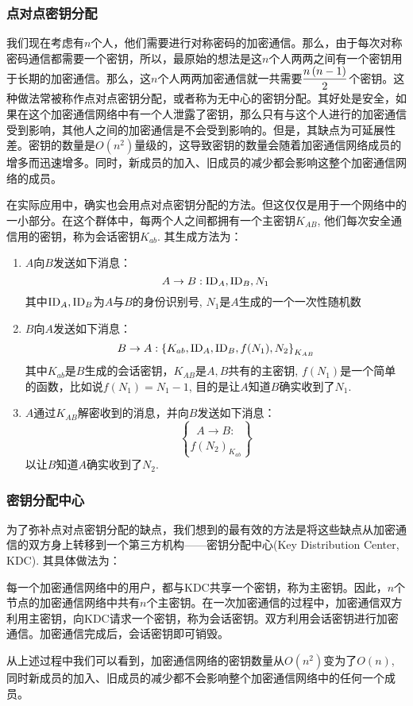 \subsubsection{点对点密钥分配}
我们现在考虑有$n$个人，他们需要进行对称密码的加密通信。那么，由于每次对称密码通信都需要一个密钥，所以，最原始的想法是这$n$个人两两之间有一个密钥用于长期的加密通信。那么，这$n$个人两两加密通信就一共需要$\displaystyle\frac{n\left( {n-1}\right)}{2}$个密钥。这种做法常被称作点对点密钥分配，或者称为无中心的密钥分配。其好处是安全，如果在这个加密通信网络中有一个人泄露了密钥，那么只有与这个人进行的加密通信受到影响，其他人之间的加密通信是不会受到影响的。但是，其缺点为可延展性差。密钥的数量是$O(n^2)$量级的，这导致密钥的数量会随着加密通信网络成员的增多而迅速增多。同时，新成员的加入、旧成员的减少都会影响这整个加密通信网络的成员。\par
在实际应用中，确实也会用点对点密钥分配的方法。但这仅仅是用于一个网络中的一小部分。在这个群体中，每两个人之间都拥有一个主密钥$K_{AB}$, 他们每次安全通信用的密钥，称为会话密钥$K_{ab}$. 其生成方法为：
\begin{enumerate}
	\item $A$向$B$发送如下消息：
	\[A\to B: \mathrm{ID}_A, \mathrm{ID}_B, N_1\]
	其中$\mathrm{ID}_A, \mathrm{ID}_B$为$A$与$B$的身份识别号, $N_1$是$A$生成的一个一次性随机数
	\item $B$向$A$发送如下消息：
	\[B\to A: \left\{ {K_{ab}, \mathrm{ID}_A, \mathrm{ID}_B, f(N_1), N_2} \right\}_{K_{AB}}\]
	其中$K_{ab}$是$B$生成的会话密钥，$K_{AB}$是$A, B$共有的主密钥, $f(N_1)$是一个简单的函数，比如说$f(N_1)=N_1-1$, 目的是让$A$知道$B$确实收到了$N_1$.
	\item $A$通过$K_{AB}$解密收到的消息，并向$B$发送如下消息：
	\[A\to B:\brace{f(N_2)}_{K_{ab}}\]
	以让$B$知道$A$确实收到了$N_2$.
\end{enumerate}
\subsubsection{密钥分配中心}
为了弥补点对点密钥分配的缺点，我们想到的最有效的方法是将这些缺点从加密通信的双方身上转移到一个第三方机构——密钥分配中心(Key Distribution Center, KDC). 其具体做法为：\par
每一个加密通信网络中的用户，都与KDC共享一个密钥，称为主密钥。因此，$n$个节点的加密通信网络中共有$n$个主密钥。在一次加密通信的过程中，加密通信双方利用主密钥，向KDC请求一个密钥，称为会话密钥。双方利用会话密钥进行加密通信。加密通信完成后，会话密钥即可销毁。\par
从上述过程中我们可以看到，加密通信网络的密钥数量从$O(n^2)$变为了$O(n)$, 同时新成员的加入、旧成员的减少都不会影响整个加密通信网络中的任何一个成员。
